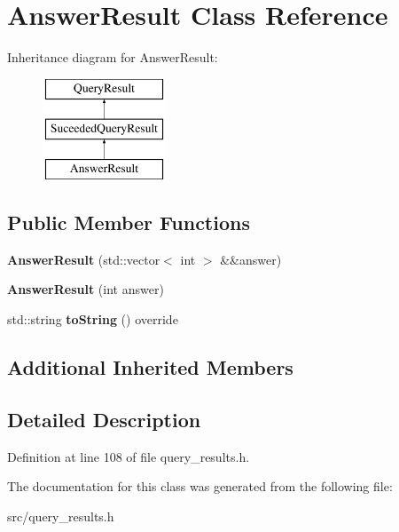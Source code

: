 \hypertarget{class_answer_result}{}\section{Answer\+Result Class Reference}
\label{class_answer_result}
Inheritance diagram for Answer\+Result\+:\begin{figure}[H]
\begin{center}
\leavevmode
\includegraphics[height=3.000000cm]{class_answer_result}
\end{center}
\end{figure}
\subsection*{Public Member Functions}
\begin{DoxyCompactItemize}
\item 
\mbox{\label{class_answer_result_a2e447348660da65b3f8d22cee2666b19}} 
{\bfseries Answer\+Result} (std\+::vector$<$ int $>$ \&\&answer)
\item 
\mbox{\label{class_answer_result_ab8ae0b845ea1aa32d8d86553e9dbd71b}} 
{\bfseries Answer\+Result} (int answer)
\item 
\mbox{\label{class_answer_result_aefaade9c11adfcbe0aae4e4296658cbd}} 
std\+::string {\bfseries to\+String} () override
\end{DoxyCompactItemize}
\subsection*{Additional Inherited Members}


\subsection{Detailed Description}


Definition at line 108 of file query\+\_\+results.\+h.



The documentation for this class was generated from the following file\+:\begin{DoxyCompactItemize}
\item 
src/query\+\_\+results.\+h\end{DoxyCompactItemize}
